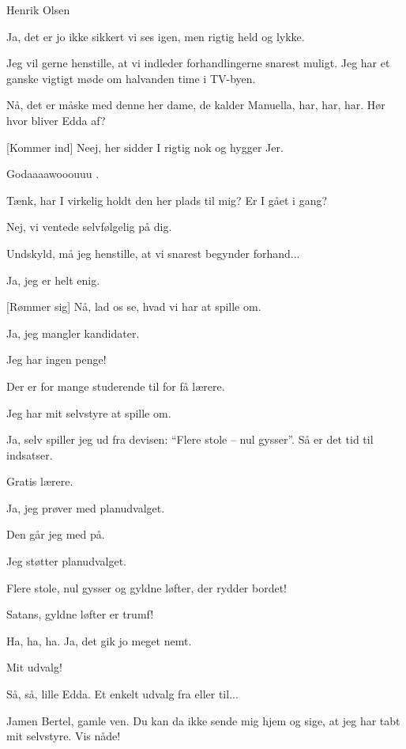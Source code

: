 \documentclass[a4paper,11pt]{article}
\begin{document}
\begin{sketch}
 Henrik Olsen

 Ja, det er jo ikke sikkert vi ses igen, men rigtig held og lykke.

 Jeg vil gerne henstille, at vi indleder forhandlingerne snarest muligt. Jeg har et ganske vigtigt møde om halvanden time i TV-byen.

 Nå, det er måske med denne her dame, de kalder Manuella, har, har, har. Hør hvor bliver Edda af?

[Kommer ind] Neej, her sidder I rigtig nok og hygger Jer.

 Godaaaawooouuu .

 Tænk, har I virkelig holdt den her plads til mig? Er I gået i gang?

 Nej, vi ventede selvfølgelig på dig.

 Undskyld, må jeg henstille, at vi snarest begynder forhand...

 Ja, jeg er helt enig. 

 [Rømmer sig] Nå, lad os se, hvad vi har at spille om.

 Ja, jeg mangler kandidater.

 Jeg har ingen penge!

 Der er for mange studerende til for få lærere.

 Jeg har mit selvstyre at spille om.

 Ja, selv spiller jeg ud fra devisen: ``Flere stole -- nul gysser''. Så er det tid til indsatser.

 Gratis lærere.

 Ja, jeg prøver med planudvalget.

 Den går jeg med på.

 Jeg støtter planudvalget.

 Flere stole, nul gysser og gyldne løfter, der rydder bordet!

 Satans, gyldne løfter er trumf!

 Ha, ha, ha. Ja, det gik jo meget nemt.

 Mit udvalg!

 Så, så, lille Edda. Et enkelt udvalg fra eller til...

 Jamen Bertel, gamle ven. Du kan da ikke sende mig hjem og sige, at jeg har tabt mit selvstyre. Vis nåde!


\end{sketch}
\end{document}
